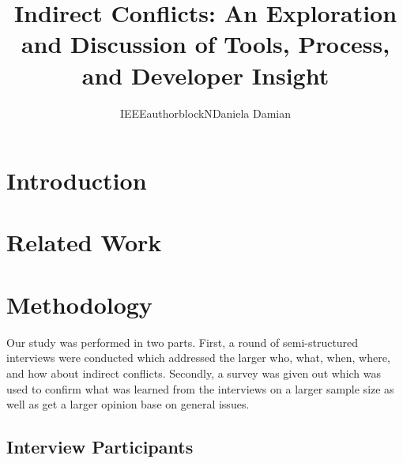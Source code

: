\documentclass[conference]{IEEEtran}
\begin{document}
\title{Indirect Conflicts: An Exploration and Discussion of Tools, Process, and Developer Insight}

\author{
IEEEauthorblockN{Daniela Damian}
}

\maketitle

\begin{abstract}

\end{abstract}

\section{Introduction}
\label{sec:intro}

\section{Related Work}

\section{Methodology}

Our study was performed in two parts. First, a round of semi-structured interviews were conducted which 
addressed the larger who, what, when, where, and how about indirect conflicts. Secondly, a survey was given
out which was used to confirm what was learned from the interviews on a larger sample size as well as get
a larger opinion base on general issues.

\subsection{Interview Participants}
\end{document}
